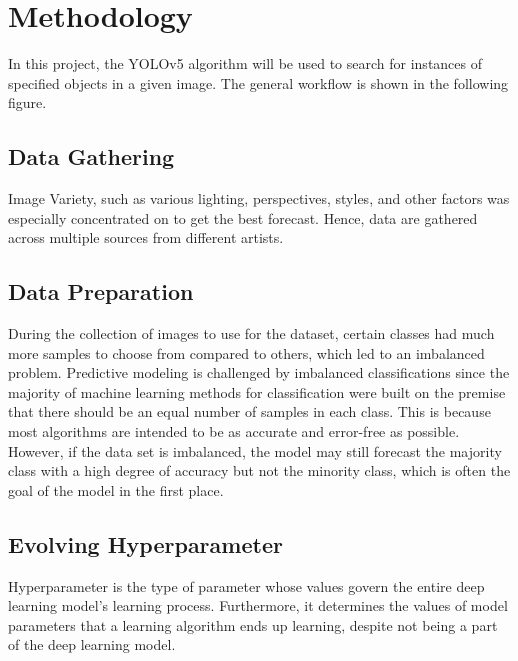 \label{Chapter Methodology} 
\section{Methodology}
    In this project, the YOLOv5 algorithm will be used to search for instances of specified objects in a given image.
    The general workflow is shown in the following figure.\\
           
        \subsection{Data Gathering}
            Image Variety, such as various lighting, perspectives, styles, and other factors was especially concentrated on to get the best forecast. 
            Hence, data are gathered across multiple sources from different artists.
            
            
        \subsection{Data Preparation}
            During the collection of images to use for the dataset, certain classes had much more samples to choose from compared to others, which led to an imbalanced problem.
            Predictive modeling is challenged by imbalanced classifications since the majority of machine learning methods for classification were built on the premise that there should be an equal number of samples in each class. This is because most algorithms are intended to be as accurate and error-free as possible.
            However, if the data set is imbalanced, the model may still forecast the majority class with a high degree of accuracy but not the minority class, which is often the goal of the model in the first place.
            
                      
            
        \subsection{Evolving Hyperparameter}
        Hyperparameter is the type of parameter whose values govern the entire deep learning model's learning process. 
        Furthermore, it determines the values of model parameters that a learning algorithm ends up learning, despite not being a part of the deep learning model.

